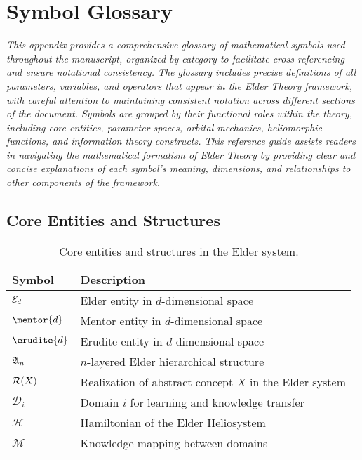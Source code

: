 \chapter{Symbol Glossary}

\textit{This appendix provides a comprehensive glossary of mathematical symbols used throughout the manuscript, organized by category to facilitate cross-referencing and ensure notational consistency. The glossary includes precise definitions of all parameters, variables, and operators that appear in the Elder Theory framework, with careful attention to maintaining consistent notation across different sections of the document. Symbols are grouped by their functional roles within the theory, including core entities, parameter spaces, orbital mechanics, heliomorphic functions, and information theory constructs. This reference guide assists readers in navigating the mathematical formalism of Elder Theory by providing clear and concise explanations of each symbol's meaning, dimensions, and relationships to other components of the framework.}

\section{Core Entities and Structures}

\begin{table}[h]
\centering
\begin{tabular}{|l|p{10cm}|}
\hline
\textbf{Symbol} & \textbf{Description} \\
\hline
$\mathcal{E}_{d}$ & Elder entity in $d$-dimensional space \\
\hline
$\mentor{d}$ & Mentor entity in $d$-dimensional space \\
\hline
$\erudite{d}$ & Erudite entity in $d$-dimensional space \\
\hline
$\mathfrak{A}_{n}$ & $n$-layered Elder hierarchical structure \\
\hline
$\mathcal{R}(X)$ & Realization of abstract concept $X$ in the Elder system \\
\hline
$\mathcal{D}_i$ & Domain $i$ for learning and knowledge transfer \\
\hline
$\mathcal{H}$ & Hamiltonian of the Elder Heliosystem \\
\hline
$\mathcal{M}$ & Knowledge mapping between domains \\
\hline
\end{tabular}
\caption{Core entities and structures in the Elder system.}
\label{tab:symbols_core}
\end{table}

